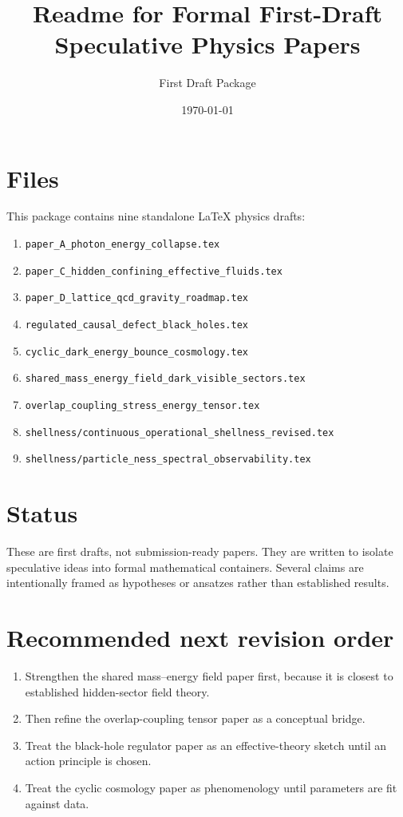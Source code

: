 \documentclass[11pt]{article}
\title{Readme for Formal First-Draft Speculative Physics Papers}
\author{First Draft Package}
\date{\today}
\begin{document}
\maketitle

\section*{Files}
This package contains nine standalone LaTeX physics drafts:
\begin{enumerate}
    \item \texttt{paper\_A\_photon\_energy\_collapse.tex}
    \item \texttt{paper\_C\_hidden\_confining\_effective\_fluids.tex}
    \item \texttt{paper\_D\_lattice\_qcd\_gravity\_roadmap.tex}
    \item \texttt{regulated\_causal\_defect\_black\_holes.tex}
    \item \texttt{cyclic\_dark\_energy\_bounce\_cosmology.tex}
    \item \texttt{shared\_mass\_energy\_field\_dark\_visible\_sectors.tex}
    \item \texttt{overlap\_coupling\_stress\_energy\_tensor.tex}
    \item \texttt{shellness/continuous\_operational\_shellness\_revised.tex}
    \item \texttt{shellness/particle\_ness\_spectral\_observability.tex}
\end{enumerate}

\section*{Status}
These are first drafts, not submission-ready papers. They are written to isolate speculative ideas into formal mathematical containers. Several claims are intentionally framed as hypotheses or ansatzes rather than established results.

\section*{Recommended next revision order}
\begin{enumerate}
    \item Strengthen the shared mass--energy field paper first, because it is closest to established hidden-sector field theory.
    \item Then refine the overlap-coupling tensor paper as a conceptual bridge.
    \item Treat the black-hole regulator paper as an effective-theory sketch until an action principle is chosen.
    \item Treat the cyclic cosmology paper as phenomenology until parameters are fit against data.
\end{enumerate}
\end{document}
